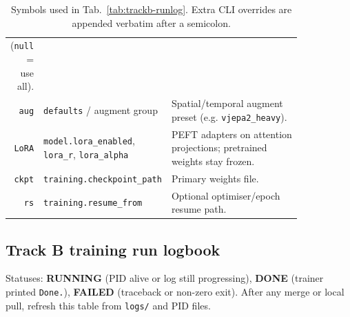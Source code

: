 \begin{table}[ht]
\begin{tabular}{@{}r p{0.32\linewidth} p{0.52\linewidth}@{}}
(\texttt{null} = use all). \\
\texttt{aug} & \texttt{defaults} / augment group & Spatial/temporal augment
preset (e.g. \texttt{vjepa2\_heavy}). \\
\texttt{LoRA} & \texttt{model.lora\_enabled}, \texttt{lora\_r},
\texttt{lora\_alpha} & PEFT adapters on attention projections; pretrained
weights stay frozen. \\
\texttt{ckpt} & \texttt{training.checkpoint\_path} & Primary weights file. \\
\texttt{rs} & \texttt{training.resume\_from} & Optional optimiser/epoch
resume path. \\
\bottomrule
\end{tabular}
\caption{Symbols used in Tab.~\ref{tab:trackb-runlog}.  Extra CLI overrides
are appended verbatim after a semicolon.}
\label{tab:trackb-glossary}
\end{table}

\subsection{Track B training run logbook}
\label{sec:trackb:runlog}

Statuses: \textbf{RUNNING} (PID alive or log still progressing),
\textbf{DONE} (trainer printed \texttt{Done.}), \textbf{FAILED} (traceback
or non-zero exit).  After any merge or local pull, refresh this table
from \texttt{logs/} and PID files.

